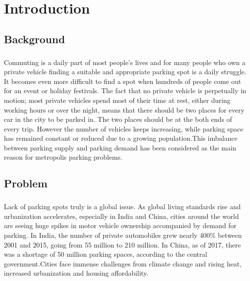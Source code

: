 \chapter{Introduction}

    \section{Background}
    \paragraph*{}
    Commuting is a daily part of most people's lives and for many people who own a private vehicle finding a suitable and appropriate parking spot is a daily struggle. It becomes even more difficult to find a spot when hundreds of people come out for an event or holiday festivals. The fact that no private vehicle is perpetually in motion; most private vehicles spend most of their time at rest, either during working hours or over the night, means that there should be two places for every car in the city to be parked in. The two places should be at the both ends of every trip. However the number of vehicles keeps increasing, while parking space has remained constant or reduced due to a growing population.This imbalance between parking supply and parking demand has been considered as the main reason for metropolis parking problems.

    \section{Problem}
    \paragraph*{}
    Lack of parking spots truly is a global issue. As global living standards rise and urbanization accelerates, especially in India and China, cities around the world are seeing huge spikes in motor vehicle ownership accompanied by demand for parking. In India, the number of private automobiles grew nearly 400\% between 2001 and 2015, going from 55 million to 210 million. In China, as of 2017, there was a shortage of 50 million parking spaces, according to the central government.Cities face immense challenges from climate change and rising heat, increased urbanization and housing affordability.

